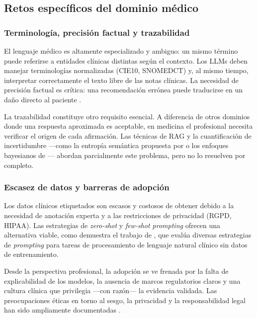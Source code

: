 \subsection{Retos específicos del dominio médico}
\label{subsec:retos}

\subsubsection*{Terminología, precisión factual y trazabilidad}

El lenguaje médico es altamente especializado y ambiguo: un mismo término puede referirse a entidades clínicas distintas según el contexto. Los \ac{LLM}s deben manejar terminologías normalizadas (\ac{CIE10}, \ac{SNOMEDCT}) y, al mismo tiempo, interpretar correctamente el texto libre de las notas clínicas. La necesidad de precisión factual es crítica: una recomendación errónea puede traducirse en un daño directo al paciente \parencite{haltaufderheide2024}.

La trazabilidad constituye otro requisito esencial. A diferencia de otros dominios donde una respuesta aproximada es aceptable, en medicina el profesional necesita verificar el origen de cada afirmación. Las técnicas de \ac{RAG} y la cuantificación de incertidumbre ---como la entropía semántica propuesta por \textcite{pennydimri2025} o los enfoques bayesianos de \textcite{hossain2025}--- abordan parcialmente este problema, pero no lo resuelven por completo.

\subsubsection*{Escasez de datos y barreras de adopción}

Los datos clínicos etiquetados son escasos y costosos de obtener debido a la necesidad de anotación experta y a las restricciones de privacidad (\ac{RGPD}, \ac{HIPAA}). Las estrategias de \textit{zero-shot} y \textit{few-shot prompting} ofrecen una alternativa viable, como demuestra el trabajo de \textcite{sivarajkumar2024}, que evalúa diversas estrategias de \textit{prompting} para tareas de procesamiento de lenguaje natural clínico sin datos de entrenamiento.

Desde la perspectiva profesional, la adopción se ve frenada por la falta de explicabilidad de los modelos, la ausencia de marcos regulatorios claros y una cultura clínica que privilegia ---con razón--- la evidencia validada. Las preocupaciones éticas en torno al sesgo, la privacidad y la responsabilidad legal han sido ampliamente documentadas \parencite{haltaufderheide2024,he2025}.

